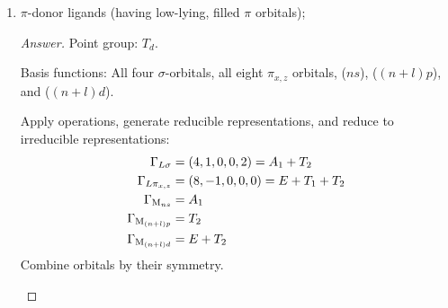\documentclass[../psets.tex]{subfiles}
\begin{document}
\begin{enumerate}[label={\Roman*)}]
\begin{enumerate}
\begin{proof}[Answer]
\begin{center}
            \end{center}
        \end{proof}
        \item $\pi$-donor ligands (having low-lying, filled $\pi$ orbitals);
        \begin{proof}[Answer]
            Point group: $T_d$.\par
            Basis functions: All four  $\sigma$-orbitals, all eight  $\pi_{x,z}$ orbitals, ($ns$), ($(n+l)p$), and ($(n+l)d$).\par
            Apply operations, generate reducible representations, and reduce to irreducible representations:
            \begin{align*}
                \Gamma_{L\sigma} &= (4,1,0,0,2) = A_1+T_2\\
                \Gamma_{L\pi_{x,z}} &= (8,-1,0,0,0) = E+T_1+T_2\\
                \Gamma_{\ce{M}_{ns}} &= A_1\\
                \Gamma_{\ce{M}_{(n+l)p}} &= T_2\\
                \Gamma_{\ce{M}_{(n+l)d}} &= E+T_2
            \end{align*}
            Combine orbitals by their symmetry.
            \begin{center}
\end{center}
\end{proof}
\end{enumerate}
\end{enumerate}
\end{document}

